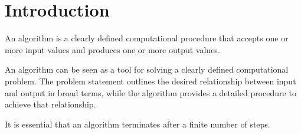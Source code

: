 \section{Introduction}

\begin{definition}
    An algorithm is a clearly defined computational procedure that accepts one or more input values and produces one or more output values.
\end{definition}
An algorithm can be seen as a tool for solving a clearly defined computational problem. 
The problem statement outlines the desired relationship between input and output in broad terms, while the algorithm provides a detailed procedure to achieve that relationship.

It is essential that an algorithm terminates after a finite number of steps.